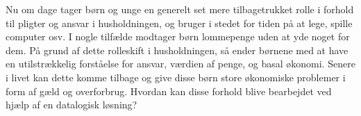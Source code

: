 Nu om dage tager børn og unge en generelt set mere tilbagetrukket rolle i forhold til pligter og ansvar i husholdningen, og bruger i stedet for tiden på at lege, spille computer osv. I nogle tilfælde modtager børn lommepenge uden at yde noget for dem\cite{Boerneliv}. På grund af dette rolleskift i husholdningen, så ender børnene med at have en utilstrækkelig forståelse for ansvar, værdien af penge, og basal økonomi\cite{BusinessDK2}. Senere i livet kan dette komme tilbage og give disse børn store økonomiske problemer i form af gæld og overforbrug. Hvordan kan disse forhold blive bearbejdet ved hjælp af en datalogisk løsning?
